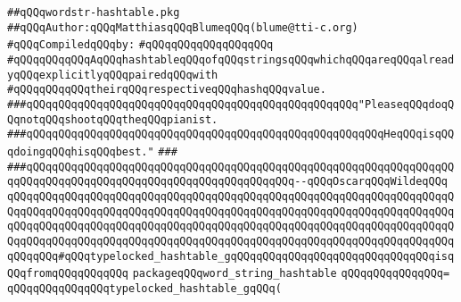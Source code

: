 \label{src/lib/compiler/front/basics/hash/wordstr-hashtable.pkg}
\verb|##qQQqwordstr-hashtable.pkg|\newline
\verb|##qQQqAuthor:qQQqMatthiasqQQqBlumeqQQq(blume@tti-c.org)|\newline
\newline
\verb|#qQQqCompiledqQQqby:|\newline
\verb|#qQQqqQQqqQQqqQQqqQQq|\newline
\newline
\newline
\newline
\verb|#qQQqqQQqqQQqAqQQqhashtableqQQqofqQQqstringsqQQqwhichqQQqareqQQqalreadyqQQqexplicitlyqQQqpairedqQQqwith|\newline
\verb|#qQQqqQQqqQQqtheirqQQqrespectiveqQQqhashqQQqvalue.|\newline
\newline
\newline
\newline
\newline
\verb|###qQQqqQQqqQQqqQQqqQQqqQQqqQQqqQQqqQQqqQQqqQQqqQQqqQQq"PleaseqQQqdoqQQqnotqQQqshootqQQqtheqQQqpianist.|\newline
\verb|###qQQqqQQqqQQqqQQqqQQqqQQqqQQqqQQqqQQqqQQqqQQqqQQqqQQqqQQqHeqQQqisqQQqdoingqQQqhisqQQqbest."|\newline
\verb|###|\newline
\verb|###qQQqqQQqqQQqqQQqqQQqqQQqqQQqqQQqqQQqqQQqqQQqqQQqqQQqqQQqqQQqqQQqqQQqqQQqqQQqqQQqqQQqqQQqqQQqqQQqqQQqqQQqqQQqqQQq--qQQqOscarqQQqWildeqQQq|\newline
\newline
\newline
\newline
\verb|qQQqqQQqqQQqqQQqqQQqqQQqqQQqqQQqqQQqqQQqqQQqqQQqqQQqqQQqqQQqqQQqqQQqqQQqqQQqqQQqqQQqqQQqqQQqqQQqqQQqqQQqqQQqqQQqqQQqqQQqqQQqqQQqqQQqqQQqqQQqqQQqqQQqqQQqqQQqqQQqqQQqqQQqqQQqqQQqqQQqqQQqqQQqqQQqqQQqqQQqqQQqqQQqqQQqqQQqqQQqqQQqqQQqqQQqqQQqqQQqqQQqqQQqqQQqqQQqqQQqqQQqqQQqqQQqqQQqqQQqqQQqqQQq#qQQqtypelocked_hashtable_gqQQqqQQqqQQqqQQqqQQqqQQqqQQqqQQqisqQQqfromqQQqqQQqqQQq|\newline
\verb|packageqQQqword_string_hashtable|\newline
\verb|qQQqqQQqqQQqqQQq=|\newline
\verb|qQQqqQQqqQQqqQQqtypelocked_hashtable_gqQQq(|\newline
